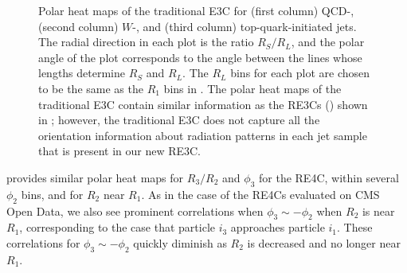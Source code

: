\begin{figure}
{    }
    \caption[Polar heat maps of the traditional three-point energy correlator on QCD, \(W\), and top jets.]{
        Polar heat maps of the traditional E3C for (first column) QCD-, (second column) \(W\)-, and (third column) top-quark-initiated jets.
        The radial direction in each plot is the ratio \(R_S/R_L\), and the polar angle of the plot corresponds to the angle between the lines whose lengths determine \(R_S\) and \(R_L\).
        The \(R_L\) bins for each plot are chosen to be the same as the \(R_1\) bins in .
        The polar heat maps of the traditional E3C contain similar information as the RE3Cs () shown in ;
        however, the traditional E3C does not capture all the orientation information about radiation patterns in each jet sample that is present in our new RE3C.
    }
	\label{fig:pythia_old_e3cs}%
\end{figure}

 provides similar polar heat maps for \(R_3/R_2\) and \(\phi_3\) for the RE4C, within several \(\phi_2\) bins, and for \(R_2\) near \(R_1\).
%
As in the case of the RE4Cs evaluated on CMS Open Data, we also see prominent correlations when \(\phi_3 \sim -\phi_2\) when \(R_2\) is near \(R_1\), corresponding to the case that particle \(i_3\) approaches particle \(i_1\).
%
These correlations for \(\phi_3 \sim -\phi_2\) quickly diminish as \(R_2\) is decreased and no longer near \(R_1\).

